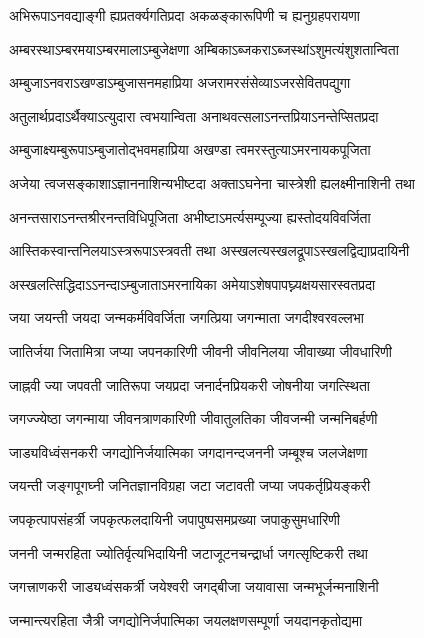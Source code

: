 \twolineshloka
{अभिरूपाऽनवद्याङ्गी ह्यप्रतर्क्यगतिप्रदा}
{अकळङ्कारूपिणी च ह्यनुग्रहपरायणा}%

\twolineshloka
{अम्बरस्थाऽम्बरमयाऽम्बरमालाऽम्बुजेक्षणा}
{अम्बिकाऽब्जकराऽब्जस्थांऽशुमत्यंशुशतान्विता}%

\twolineshloka
{अम्बुजाऽनवराऽखण्डाऽम्बुजासनमहाप्रिया}
{अजरामरसंसेव्याऽजरसेवितपद्युगा}%

\twolineshloka
{अतुलार्थप्रदाऽर्थैक्याऽत्युदारा त्वभयान्विता}
{अनाथवत्सलाऽनन्तप्रियाऽनन्तेप्सितप्रदा}%

\twolineshloka
{अम्बुजाक्ष्यम्बुरूपाऽम्बुजातोद्भवमहाप्रिया}
{अखण्डा त्वमरस्तुत्याऽमरनायकपूजिता}%

\twolineshloka
{अजेया त्वजसङ्काशाऽज्ञाननाशिन्यभीष्टदा}
{अक्ताऽघनेना चास्त्रेशी ह्यलक्ष्मीनाशिनी तथा}%

\twolineshloka
{अनन्तसाराऽनन्तश्रीरनन्तविधिपूजिता}
{अभीष्टाऽमर्त्यसम्पूज्या ह्यस्तोदयविवर्जिता}%

\twolineshloka
{आस्तिकस्वान्तनिलयाऽस्त्ररूपाऽस्त्रवती तथा}
{अस्खलत्यस्खलद्रूपाऽस्खलद्विद्याप्रदायिनी}%

\twolineshloka
{अस्खलत्सिद्धिदाऽऽनन्दाऽम्बुजाताऽमरनायिका}
{अमेयाऽशेषपापघ्न्यक्षयसारस्वतप्रदा}%

\twolineshloka
{जया जयन्ती जयदा जन्मकर्मविवर्जिता}
{जगत्प्रिया जगन्माता जगदीश्वरवल्लभा}%

\twolineshloka
{जातिर्जया जितामित्रा जप्या जपनकारिणी}
{जीवनी जीवनिलया जीवाख्या जीवधारिणी}%

\twolineshloka
{जाह्नवी ज्या जपवती जातिरूपा जयप्रदा}
{जनार्दनप्रियकरी जोषनीया जगत्स्थिता}%

\twolineshloka
{जगज्ज्येष्ठा जगन्माया जीवनत्राणकारिणी}
{जीवातुलतिका जीवजन्मी जन्मनिबर्हणी}%

\twolineshloka
{जाड्यविध्वंसनकरी जगद्योनिर्जयात्मिका}
{जगदानन्दजननी जम्बूश्च जलजेक्षणा}%

\twolineshloka
{जयन्ती जङ्गपूगघ्नी जनितज्ञानविग्रहा}
{जटा जटावती जप्या जपकर्तृप्रियङ्करी}%

\twolineshloka
{जपकृत्पापसंहर्त्री जपकृत्फलदायिनी}
{जपापुष्पसमप्रख्या जपाकुसुमधारिणी}%

\twolineshloka
{जननी जन्मरहिता ज्योतिर्वृत्यभिदायिनी}
{जटाजूटनचन्द्रार्धा जगत्सृष्टिकरी तथा}%

\twolineshloka
{जगत्त्राणकरी जाड्यध्वंसकर्त्री जयेश्वरी}
{जगद्बीजा जयावासा जन्मभूर्जन्मनाशिनी}%

\twolineshloka
{जन्मान्त्यरहिता जैत्री जगद्योनिर्जपात्मिका}
{जयलक्षणसम्पूर्णा जयदानकृतोद्यमा}%


